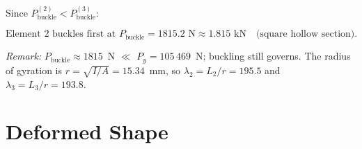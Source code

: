 \documentclass[11pt, a4paper]{article}
\begin{document}
\noindent Since $P_{\text{buckle}}^{(2)} < P_{\text{buckle}}^{(3)}$:

\begin{equation}\label{eq:buckle}
\boxed{
\text{Element 2 buckles first at } P_{\text{buckle}} = 1815.2 \text{ N} \approx 1.815 \text{ kN}\quad\text{(square hollow section).}
}
\end{equation}

\noindent\textit{Remark:}\; $P_{\text{buckle}}\approx1815$~N $\ll$ $P_y=105\,469$~N; buckling still governs.  The radius of gyration is $r=\sqrt{I/A}=15.34$~mm, so $\lambda_2=L_2/r=195.5$ and $\lambda_3=L_3/r=193.8$.

\section{Deformed Shape}
\end{document}

